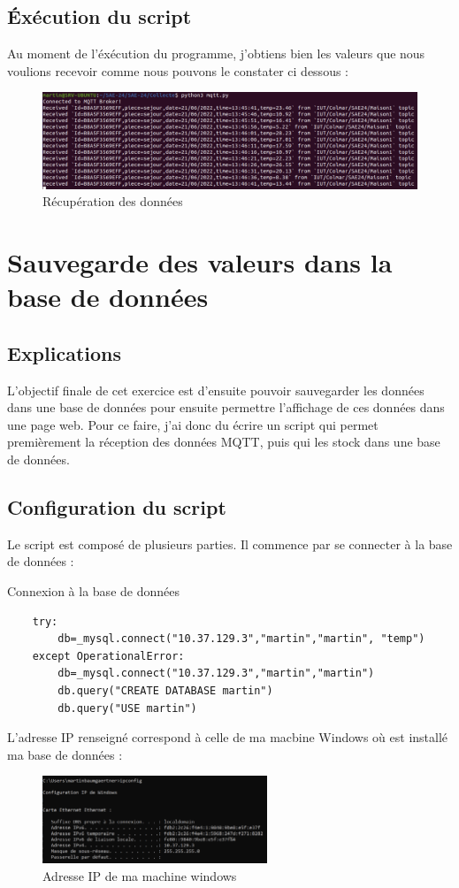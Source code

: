 \documentclass[12pt, a4paper]{article}
\begin{document}
		\subsection{Éxécution du script}
		Au moment de l'éxécution du programme, j'obtiens bien les valeurs que 
		nous voulions recevoir comme nous pouvons le constater ci dessous :
		\begin{figure}[H]
			\centering
			\includegraphics[width=1\textwidth]{../img/recup.png}
			\caption{Récupération des données}
			\label{fig:recup}
		\end{figure}

	\section{Sauvegarde des valeurs dans la base de données}
		\subsection{Explications}
		L'objectif finale de cet exercice est d'ensuite pouvoir sauvegarder les données dans une 
		base de données pour ensuite permettre l'affichage de ces données dans une page web.
		Pour ce faire, j'ai donc du écrire un script qui permet premièrement la réception
		des données MQTT, puis qui les stock dans une base de données.


		\subsection{Configuration du script}
		Le script est composé de plusieurs parties. Il commence par se connecter à la base 
		de données :
		\begin{listing}[H]
			\caption{Connexion à la base de données}
			\label{lst:co}
			\begin{verbatim}
	try:
    	db=_mysql.connect("10.37.129.3","martin","martin", "temp")
	except OperationalError:
    	db=_mysql.connect("10.37.129.3","martin","martin")
    	db.query("CREATE DATABASE martin")
    	db.query("USE martin")
			\end{verbatim}
		\end{listing}
		\newpage
		L'adresse IP renseigné correspond à celle de ma macbine Windows où est installé
		ma base de données :
		\begin{figure}[H]
			\centering
			\includegraphics[width=0.6\textwidth]{../img/ip.png}
			\caption{Adresse IP de ma machine windows}
			\label{fig:ip}
		\end{figure}
	
\end{document}
